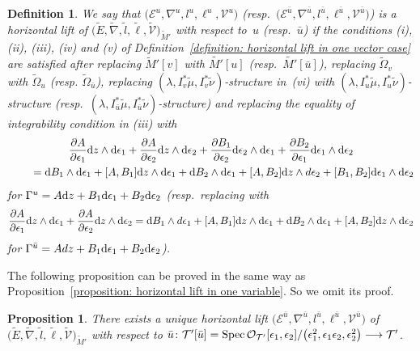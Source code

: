 \documentclass[pdftex]{sigma}
\numberwithin{equation}{section}
\newtheorem{Proposition}[Theorem]{Proposition}
\newtheorem{Definition}[Theorem]{Definition}
\newcommand\Spec{\mathop{\rm Spec}\nolimits}
\begin{document}
\begin{Definition} \label{definition: horizontal lifts in general}
We say that
$\big({\mathcal E}^u,\nabla^u,l^u,\ell^u,{\mathcal V}^u\big)$
\big(resp.\ $\big({\mathcal E}^{\bar{u}},\nabla^{\bar{u}},l^{\bar{u}},\ell^{\bar{u}},{\mathcal V}^{\bar{u}}\big)$\big)
is a horizontal lift of
$\big(\tilde{E},\tilde{\nabla},\tilde{l},\tilde{\ell},\tilde{\mathcal V}\big)_{\tilde{M}'}$
with respect to~$u$ (resp.\ $\bar{u}$)
if the conditions (i), (ii), (iii), (iv) and (v) of Definition~\ref{definition: horizontal lift in one vector case}
are satisfied after replacing
$\tilde{M}'[v]$ with $\tilde{M'}[u]$ (resp.\ $\tilde{M'}[\bar{u}]$),
replacing $\tilde{\Omega}_v$ with $\tilde{\Omega}_u$
(resp. $\tilde{\Omega}_{\bar{u}}$),
replacing $(\lambda,I_v^*\tilde{\mu},I_v^*\tilde{\nu})$-structure in~(vi)
with $(\lambda,I_u^*\tilde{\mu},I_u^*\tilde{\nu})$-structure
(resp.\ $(\lambda,I_{\bar{u}}^*\tilde{\mu},I_{\bar{u}}^*\tilde{\nu})$-structure)
and replacing the equality of integrability condition in (iii) with
\begin{gather*}
\frac{\partial A}{\partial \epsilon_1}{\rm d}z\wedge {\rm d}\epsilon_1
 + \frac{\partial A}{\partial \epsilon_2}{\rm d}z\wedge {\rm d}\epsilon_2
 +\frac{\partial B_1}{\partial \epsilon_2}{\rm d}\epsilon_2\wedge {\rm d}\epsilon_1
 +\frac{\partial B_2}{\partial \epsilon_1}{\rm d}\epsilon_1\wedge {\rm d}\epsilon_2
 \\
 \qquad{} =
 {\rm d}B_1\wedge {\rm d}\epsilon_1+[A,B_1]{\rm d}z\wedge {\rm d}\epsilon_1
 +
{\rm d}B_2\wedge {\rm d}\epsilon_1+[A,B_2]{\rm d}z\wedge d\epsilon_2
 +[B_1,B_2]{\rm d}\epsilon_1\wedge {\rm d}\epsilon_2
\end{gather*}
for
$\Gamma^u=A{\rm d}z+B_1{\rm d}\epsilon_1+B_2{\rm d}\epsilon_2$
(resp.\ replacing with
\begin{align*}
 \frac{\partial A}{\partial \epsilon_1}{\rm d}z\wedge {\rm d}\epsilon_1
 + \frac{\partial A}{\partial \epsilon_2}{\rm d}z\wedge {\rm d}\epsilon_2
 =
{\rm d}B_1\wedge d\epsilon_1+[A,B_1]{\rm d}z\wedge {\rm d}\epsilon_1
 +
{\rm d}B_2\wedge {\rm d}\epsilon_1+[A,B_2]{\rm d}z\wedge {\rm d}\epsilon_2
\end{align*}
for
$\Gamma^{\bar{u}}=Adz+B_1{\rm d}\epsilon_1+B_2{\rm d}\epsilon_2$).
\end{Definition}

The following proposition can be proved in the same way as
Proposition~\ref{proposition: horizontal lift in one variable}.
So we omit its proof.

\begin{Proposition} \label{proposition: horizontal lift in two variable}
There exists a unique horizontal lift
$\big({\mathcal E}^{\bar{u}},\nabla^{\bar{u}},l^{\bar{u}},\ell^{\bar{u}},{\mathcal V}^{\bar{u}}\big)$
of
$\big(\tilde{E},\tilde{\nabla},\tilde{l},\tilde{\ell},\tilde{\mathcal V}\big)_{\tilde{M}'}$
with respect to
$\bar{u}\colon
{\mathcal T'}[\bar{u}]=\Spec {\mathcal O}_{\mathcal T'}[\epsilon_1,\epsilon_2]
 /\big(\epsilon_1^2,\epsilon_1\epsilon_2,\epsilon_2^2\big)
 \longrightarrow {\mathcal T'}$.
\end{Proposition}
\end{document}
